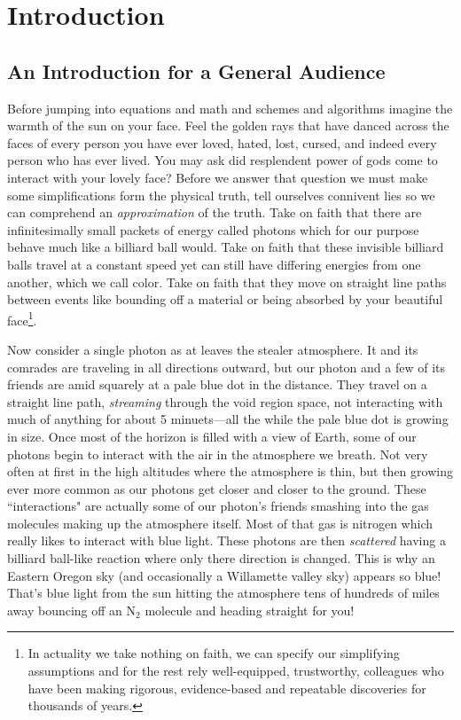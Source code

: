
\chapter{Introduction}
\label{part:intro}


\section{An Introduction for a General Audience}

Before jumping into equations and math and schemes and algorithms imagine the warmth of the sun on your face.
Feel the golden rays that have danced across the faces of every person you have ever loved, hated, lost, cursed, and indeed every person who has ever lived.
You may ask did resplendent power of gods come to interact with your lovely face?
Before we answer that question we must make some simplifications form the physical truth, tell ourselves connivent lies so we can comprehend an \textit{approximation} of the truth.
Take on faith that there are infinitesimally small packets of energy called photons which for our purpose behave much like a billiard ball would.
Take on faith that these invisible billiard balls travel at a constant speed yet can still have differing energies from one another, which we call color.
Take on faith that they move on straight line paths between events like bounding off a material or being absorbed by your beautiful face\footnote{In actuality we take nothing on faith, we can specify our simplifying assumptions and for the rest rely well-equipped, trustworthy, colleagues who have been making rigorous, evidence-based and repeatable discoveries for thousands of years.}.

Now consider a single photon as at leaves the stealer atmosphere.
It and its comrades are traveling in all directions outward, but our photon and a few of its friends are amid squarely at a pale blue dot in the distance.
They travel on a straight line path, \textit{streaming} through the void region space, not interacting with much of anything for about 5 minuets---all the while the pale blue dot is growing in size.
Once most of the horizon is filled with a view of Earth, some of our photons begin to interact with the air in the atmosphere we breath.
Not very often at first in the high altitudes where the atmosphere is thin, but then growing ever more common as our photons get closer and closer to the ground.
These ``interactions" are actually some of our photon's friends smashing into the gas molecules making up the atmosphere itself.
Most of that gas is nitrogen which really likes to interact with blue light.
These photons are then \textit{scattered} having a billiard ball-like reaction where only there direction is changed.
This is why an Eastern Oregon sky (and occasionally a Willamette valley sky) appears so blue!
That's blue light from the sun hitting the atmosphere tens of hundreds of miles away bouncing off an N$_2$ molecule and heading straight for you!

